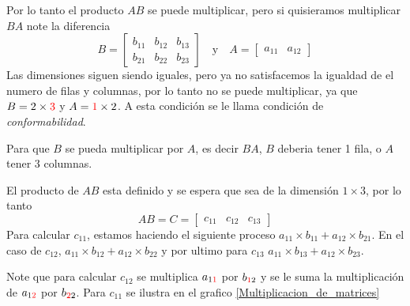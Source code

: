Por lo tanto el producto \(AB\) se puede multiplicar, pero si quisieramos multiplicar \(BA\) note la diferencia
\[
B = 
\begin{bmatrix}
    b_{11} & b_{12} & b_{13} \\
    b_{21} & b_{22} & b_{23}
\end{bmatrix}
\quad
\text{y} 
\quad
A = 
\begin{bmatrix}
    a_{11} & a_{12}    
\end{bmatrix}
\]
Las dimensiones siguen siendo iguales, pero ya no satisfacemos la igualdad de el numero de filas y columnas, por lo tanto no se puede multiplicar, ya que \(B = 2 \times {\color{red}3}\) y \(A = {\color{red}1} \times 2 \). A esta condición se le llama condición de \textit{conformabilidad}.

\begin{nota}
    Para que \(B\) se pueda multiplicar por \(A\), es decir \(BA\), \(B\) deberia tener 1 fila, o \(A\) tener \(3\) columnas.
\end{nota}

El producto de \(AB\) esta definido y se espera que sea de la dimensión \(1 \times 3\), por lo tanto 
\[
AB = C =
\begin{bmatrix}
    c_{11} & c_{12} & c_{13} 
\end{bmatrix}
\]
Para calcular \(c_{11}\), estamos haciendo el siguiente proceso \(a_{11}\times b_{11} + a_{12} \times b_{21}\). En el caso de \(c_{12}\), \(a_{11}\times b_{12} + a_{12} \times b_{22}\) y por ultimo para \(c_{13}\) \(a_{11}\times b_{13} + a_{12} \times b_{23}\).

Note que para calcular \(c_{12}\) se multiplica \(a_{1{\color{red}1}}\) por \(b_{{\color{red}1}2}\) y se le suma la multiplicación de \(a_{1{\color{red}2}}\) por \(b_{{\color{red}2}2}\). Para \(c_{11}\) se ilustra en el grafico \ref{Multiplicacion_de_matrices}

